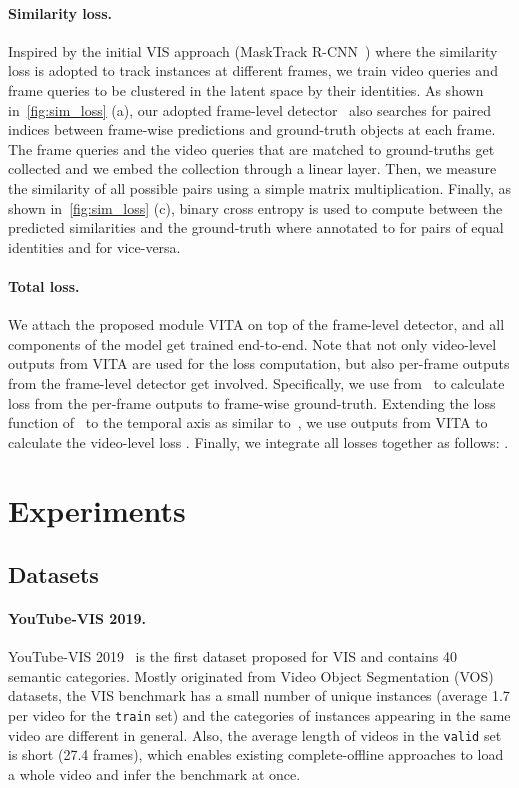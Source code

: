 \documentclass{article}
\begin{document}
\paragraph{Similarity loss.}
Inspired by the initial VIS approach (MaskTrack R-CNN~\cite{MaskTrackRCNN}) where the similarity loss is adopted to track instances at different frames, we train video queries and frame queries to be clustered in the latent space by their identities.
As shown in~\cref{fig:sim_loss} (a), our adopted frame-level detector~\cite{Mask2Former} also searches for paired indices between  frame-wise predictions and  ground-truth objects at each  frame.
The frame queries and the video queries that are matched to ground-truths get collected and we embed the collection through a linear layer.
Then, we measure the similarity of all possible pairs using a simple matrix multiplication.
Finally, as shown in~\cref{fig:sim_loss} (c), binary cross entropy is used to compute  between the predicted similarities and the ground-truth where annotated to  for pairs of equal identities and  for vice-versa.


\paragraph{Total loss.}
We attach the proposed module VITA on top of the frame-level detector, and all components of the model get trained end-to-end.
Note that not only video-level outputs from VITA are used for the loss computation, but also per-frame outputs from the frame-level detector get involved.
Specifically, we use  from~\cite{Mask2Former} to calculate loss from the per-frame outputs to frame-wise ground-truth.
Extending the loss function of~\cite{Mask2Former} to the temporal axis as similar to~\cite{IFC}, we use outputs from VITA  to calculate the video-level loss .
Finally, we integrate all losses together as follows: .

 \section{Experiments}
\label{sec:experiments}
\subsection{Datasets}
\label{sec:datasets}


\paragraph{YouTube-VIS 2019.} 
YouTube-VIS 2019~\cite{MaskTrackRCNN} is the first dataset proposed for VIS and contains 40 semantic categories.
Mostly originated from Video Object Segmentation (VOS) datasets, the VIS benchmark has a small number of unique instances (average 1.7 per video for the \texttt{train} set) and the categories of instances appearing in the same video are different in general.
Also, the average length of videos in the \texttt{valid} set is short (27.4 frames), which enables existing complete-offline approaches to load a whole video and infer the benchmark at once.
\end{document}
